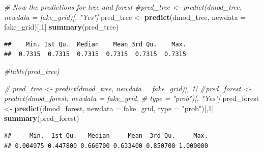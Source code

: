 \documentclass[]{article}
\newenvironment{Shaded}{\begin{snugshade}}{\end{snugshade}}
\newcommand{\KeywordTok}[1]{\textcolor[rgb]{0.13,0.29,0.53}{\textbf{{#1}}}}
\newcommand{\DataTypeTok}[1]{\textcolor[rgb]{0.13,0.29,0.53}{{#1}}}
\newcommand{\DecValTok}[1]{\textcolor[rgb]{0.00,0.00,0.81}{{#1}}}
\newcommand{\StringTok}[1]{\textcolor[rgb]{0.31,0.60,0.02}{{#1}}}
\newcommand{\CommentTok}[1]{\textcolor[rgb]{0.56,0.35,0.01}{\textit{{#1}}}}
\newcommand{\NormalTok}[1]{{#1}}
\begin{document}
\begin{Shaded}
\begin{Highlighting}[]
\CommentTok{# Now the predictions for tree and forest}
\CommentTok{#pred_tree <- predict(dmod_tree, newdata = fake_grid)[, "Yes"]}
\NormalTok{pred_tree <-}\StringTok{ }\KeywordTok{predict}\NormalTok{(dmod_tree, }\DataTypeTok{newdata =} \NormalTok{fake_grid)[,}\DecValTok{1}\NormalTok{]}
\KeywordTok{summary}\NormalTok{(pred_tree)}
\end{Highlighting}
\end{Shaded}

\begin{verbatim}
##    Min. 1st Qu.  Median    Mean 3rd Qu.    Max. 
##  0.7315  0.7315  0.7315  0.7315  0.7315  0.7315
\end{verbatim}

\begin{Shaded}
\begin{Highlighting}[]
\CommentTok{#table(pred_tree)}

\CommentTok{# pred_tree <- predict(dmod_tree, newdata = fake_grid)[, 1]}
\CommentTok{#pred_forest <- predict(dmod_forest, newdata = fake_grid, }
\CommentTok{#                       type = "prob")[, "Yes"]}
\NormalTok{pred_forest <-}\StringTok{ }\KeywordTok{predict}\NormalTok{(dmod_forest, }\DataTypeTok{newdata =} \NormalTok{fake_grid, }\DataTypeTok{type =} \StringTok{"prob"}\NormalTok{)[,}\DecValTok{1}\NormalTok{]}
\KeywordTok{summary}\NormalTok{(pred_forest)}
\end{Highlighting}
\end{Shaded}

\begin{verbatim}
##     Min.  1st Qu.   Median     Mean  3rd Qu.     Max. 
## 0.004975 0.447800 0.666700 0.633400 0.850700 1.000000
\end{verbatim}

\begin{Shaded}
\end{Shaded}
\end{document}
